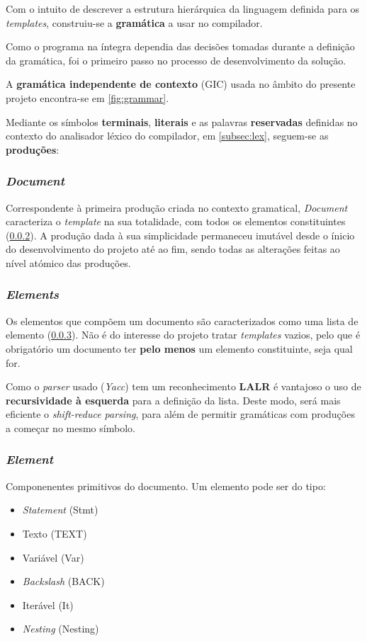\documentclass[../relatorio.tex]{subfiles}
\begin{document}
Com o intuito de descrever a estrutura hierárquica da linguagem
definida para os \textit{templates}, construiu-se a \textbf{gramática} 
a usar no compilador. 

Como o programa na íntegra dependia das decisões tomadas durante
a definição da gramática, foi o primeiro passo no processo de desenvolvimento
da solução. 

A \textbf{gramática independente de contexto} (GIC) usada 
no âmbito do presente projeto encontra-se em \ref{fig:grammar}.

Mediante os símbolos \textbf{terminais}, \textbf{literais} e as palavras 
\textbf{reservadas} definidas no contexto do analisador léxico do 
compilador, em \ref{subsec:lex}, seguem-se as \textbf{produções}:

\subsubsection{\textit{Document}}\label{grm:doc}
Correspondente à primeira produção criada no contexto gramatical,
\textit{Document} caracteriza o \textit{template} na sua totalidade,
com todos os elementos constituintes (\ref{grm:elems}).
A produção dada à sua simplicidade permaneceu imutável desde o ínicio
do desenvolvimento do projeto até ao fim, sendo todas as alterações 
feitas ao nível atómico das produções.

\subsubsection{\textit{Elements}} \label{grm:elems}
Os elementos que compõem um documento são caracterizados como uma lista 
de elemento (\ref{grm:elem}). 
Não é do interesse do projeto tratar \textit{templates} vazios, pelo que 
é obrigatório um documento ter \textbf{pelo menos} um 
elemento constituinte, seja qual for. 

Como o \textit{parser} usado (\textit{Yacc}) tem um reconhecimento \textbf{LALR}
é vantajoso o uso de \textbf{recursividade à esquerda} para a definição da lista.
Deste modo, será mais eficiente o \textit{shift-reduce parsing}, para além
de permitir gramáticas com produções a começar no mesmo símbolo.

\subsubsection{\textit{Element}}\label{grm:elem}
Componenentes primitivos do documento. 
Um elemento pode ser do tipo:
\begin{itemize}
    \item \textit{Statement}    (Stmt)
    \item Texto                 (TEXT)
    \item Variável              (Var)
    \item \textit{Backslash}    (BACK)
    \item Iterável              (It)
    \item \textit{Nesting}      (Nesting)
\end{itemize}
\end{document}
